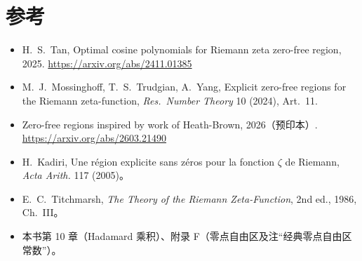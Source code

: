 \documentclass[11pt]{article}
\begin{document}
\section*{参考}
\begin{itemize}
 \item H.\ S.\ Tan, Optimal cosine polynomials for Riemann zeta zero-free region, 2025. \url{https://arxiv.org/abs/2411.01385}
 \item M.\ J.\ Mossinghoff, T.\ S.\ Trudgian, A.\ Yang, Explicit zero-free regions for the Riemann zeta-function, \emph{Res.\ Number Theory} 10 (2024), Art.~11.
 \item Zero-free regions inspired by work of Heath-Brown, 2026（预印本）. \url{https://arxiv.org/abs/2603.21490}
 \item H.\ Kadiri, Une région explicite sans zéros pour la fonction $\zeta$ de Riemann, \emph{Acta Arith.} 117 (2005)。
 \item E.\ C.\ Titchmarsh, \emph{The Theory of the Riemann Zeta-Function}, 2nd ed., 1986, Ch.~III。
 \item 本书第 10 章（Hadamard 乘积）、附录 F（零点自由区及注“经典零点自由区常数”）。
\end{itemize}
\end{document}
